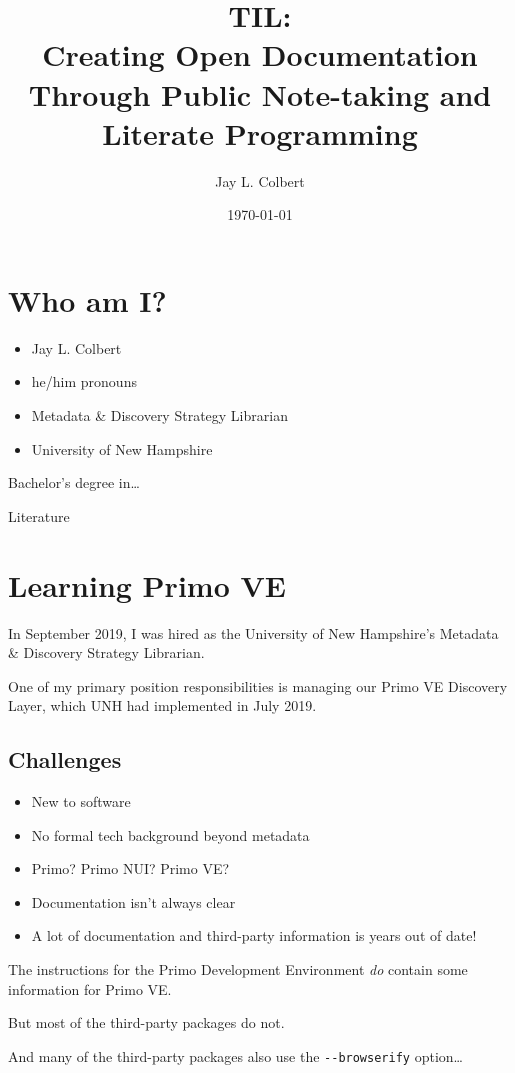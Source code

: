 \documentclass[11pt]{article}
\author{Jay L. Colbert}
\date{\today}
\title{TIL:\\\medskip
\large Creating Open Documentation Through Public Note-taking and Literate Programming}
\begin{document}
\maketitle
\setcounter{tocdepth}{1}
\tableofcontents


\section*{Who am I?}
\label{sec:org0a73ec5}
\begin{itemize}
\item Jay L. Colbert
\item he/him pronouns
\item Metadata \& Discovery Strategy Librarian
\item University of New Hampshire
\end{itemize}

Bachelor's degree in\ldots{}

Literature

\section*{Learning Primo VE}
\label{sec:org0d47203}
In September 2019, I was hired as the University of New Hampshire's Metadata \& Discovery Strategy Librarian.

One of my primary position responsibilities is managing our Primo VE Discovery Layer, which UNH had implemented in July 2019.

\subsection*{Challenges}
\label{sec:org6ab7b5e}
\begin{itemize}
\item New to software
\item No formal tech background beyond metadata
\item Primo? Primo NUI? Primo VE?
\item Documentation isn't always clear
\item A lot of documentation and third-party information is years out of date!
\end{itemize}

The instructions for the Primo Development Environment \emph{do} contain some information for Primo VE.

But most of the third-party packages do not.

And many of the third-party packages also use the \texttt{-{}-browserify} option\ldots{}
\end{document}
